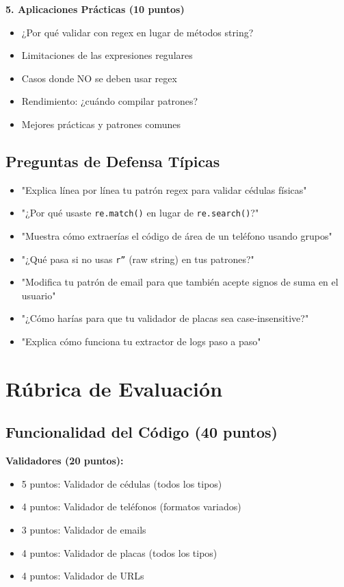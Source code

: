 \documentclass[11pt,letterpaper]{article}
\begin{document}
\textbf{5. Aplicaciones Prácticas (10 puntos)}
\begin{itemize}
    \item ¿Por qué validar con regex en lugar de métodos string?
    \item Limitaciones de las expresiones regulares
    \item Casos donde NO se deben usar regex
    \item Rendimiento: ¿cuándo compilar patrones?
    \item Mejores prácticas y patrones comunes
\end{itemize}

\subsection{Preguntas de Defensa Típicas}

\begin{itemize}
    \item "Explica línea por línea tu patrón regex para validar cédulas físicas"
    \item "¿Por qué usaste \texttt{re.match()} en lugar de \texttt{re.search()}?"
    \item "Muestra cómo extraerías el código de área de un teléfono usando grupos"
    \item "¿Qué pasa si no usas \texttt{r''} (raw string) en tus patrones?"
    \item "Modifica tu patrón de email para que también acepte signos de suma en el usuario"
    \item "¿Cómo harías para que tu validador de placas sea case-insensitive?"
    \item "Explica cómo funciona tu extractor de logs paso a paso"
\end{itemize}

\section{Rúbrica de Evaluación}

\subsection{Funcionalidad del Código (40 puntos)}

\textbf{Validadores (20 puntos):}
\begin{itemize}
    \item 5 puntos: Validador de cédulas (todos los tipos)
    \item 4 puntos: Validador de teléfonos (formatos variados)
    \item 3 puntos: Validador de emails
    \item 4 puntos: Validador de placas (todos los tipos)
    \item 4 puntos: Validador de URLs
\end{itemize}
\end{document}
